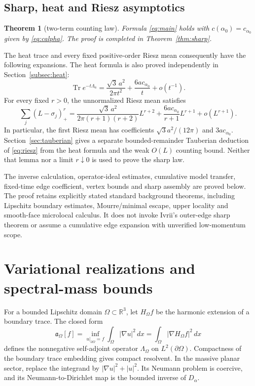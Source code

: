 \documentclass[11pt]{amsart}
\numberwithin{equation}{section}
\newtheorem{theorem}{Theorem}[section]
\theoremstyle{remark}
\newcommand{\R}{\mathbb{R}}
\newcommand{\Tr}{\operatorname{Tr}}
\newcommand{\fa}{\mathfrak{a}}
\begin{document}
\subsection{Sharp, heat and Riesz asymptotics}
\begin{theorem}[two-term counting law]\label{thm:counting}
Formula \eqref{eq:main} holds with $c(\alpha_0)=c_{\alpha_0}$ given by \eqref{eq:calpha}. The proof is completed in Theorem~\ref{thm:sharp}.
\end{theorem}

The heat trace and every fixed positive-order Riesz mean consequently have the following expansions. The heat formula is also proved independently in Section~\ref{subsec:heat}:
\begin{equation}\label{eq:heat}
\Tr e^{-t\Lambda_a}=\frac{\sqrt3\,a^2}{2\pi t^2}+\frac{6ac_{\alpha_0}}{t}+o(t^{-1}).
\end{equation}
For every fixed $r>0$, the unnormalized Riesz mean satisfies
\begin{equation}\label{eq:riesz}
\sum_j(L-\sigma_j)_+^r=\frac{\sqrt3\,a^2}{2\pi(r+1)(r+2)}L^{r+2}+\frac{6ac_{\alpha_0}}{r+1}L^{r+1}+o(L^{r+1}).
\end{equation}
In particular, the first Riesz mean has coefficients $\sqrt3a^2/(12\pi)$ and $3ac_{\alpha_0}$. Section~\ref{sec:tauberian} gives a separate bounded-remainder Tauberian deduction of \eqref{eq:riesz} from the heat formula and the weak $O(L)$ counting bound. Neither that lemma nor a limit $r\downarrow0$ is used to prove the sharp law.

The inverse calculation, operator-ideal estimates, cumulative model transfer, fixed-time edge coefficient, vertex bounds and sharp assembly are proved below. The proof retains explicitly stated standard background theorems, including Lipschitz boundary estimates, Mourre/minimal escape, upper locality and smooth-face microlocal calculus. It does not invoke Ivrii's outer-edge sharp theorem or assume a cumulative edge expansion with unverified low-momentum scope.

\section{Variational realizations and spectral-mass bounds}

For a bounded Lipschitz domain $\Omega\subset\R^3$, let $H_\Omega f$ be the harmonic extension of a boundary trace. The closed form
\begin{equation}\label{eq:form}
\fa_\Omega[f]=\inf_{u|_{\partial\Omega}=f}\int_\Omega|\nabla u|^2\,dx=\int_\Omega|\nabla H_\Omega f|^2\,dx
\end{equation}
defines the nonnegative self-adjoint operator $\Lambda_\Omega$ on $L^2(\partial\Omega)$. Compactness of the boundary trace embedding gives compact resolvent. In the massive planar sector, replace the integrand by $|\nabla u|^2+|u|^2$. Its Neumann problem is coercive, and its Neumann-to-Dirichlet map is the bounded inverse of $D_\alpha$.
\end{document}

